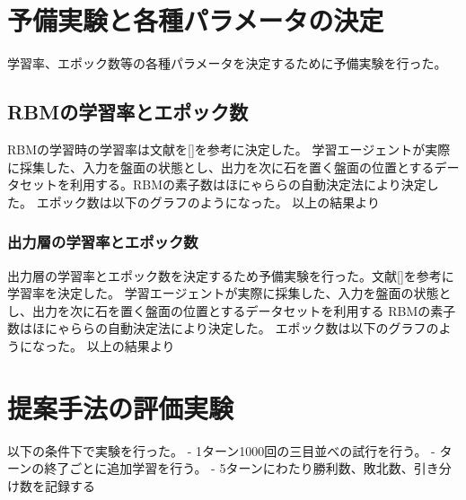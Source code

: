 \section{予備実験と各種パラメータの決定}

学習率、エポック数等の各種パラメータを決定するために予備実験を行った。

\subsection{RBMの学習率とエポック数}
RBMの学習時の学習率は文献を[]を参考に決定した。
学習エージェントが実際に採集した、入力を盤面の状態とし、出力を次に石を置く盤面の位置とするデータセットを利用する。RBMの素子数はほにゃららの自動決定法により決定した。
エポック数は以下のグラフのようになった。
以上の結果より

\subsubsection{出力層の学習率とエポック数}
出力層の学習率とエポック数を決定するため予備実験を行った。文献[]を参考に学習率を決定した。
学習エージェントが実際に採集した、入力を盤面の状態とし、出力を次に石を置く盤面の位置とするデータセットを利用する
RBMの素子数はほにゃららの自動決定法により決定した。
エポック数は以下のグラフのようになった。
以上の結果より


\section{提案手法の評価実験}
以下の条件下で実験を行った。
- 1ターン1000回の三目並べの試行を行う。
- ターンの終了ごとに追加学習を行う。
- 5ターンにわたり勝利数、敗北数、引き分け数を記録する

